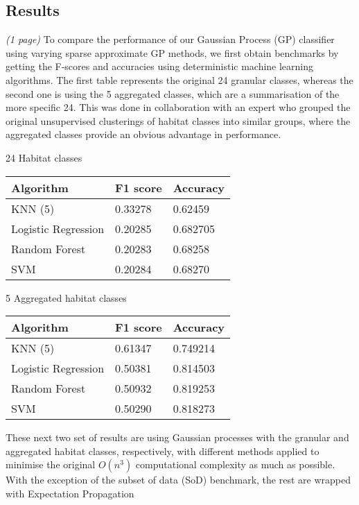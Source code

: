 \documentclass[10pt,sts]{article}
\begin{document}
\begin{multicols}{2}
    \newpage

\section{Results}
\textit{(1 page)}
To compare the performance of our Gaussian Process (GP) classifier using varying sparse approximate GP methods, we first obtain benchmarks by getting the F-scores and accuracies using deterministic machine learning algorithms. The first table represents the original 24 granular classes, whereas the second one is using the 5 aggregated classes, which are a summarisation of the more specific 24. This was done in collaboration with an expert who grouped the original unsupervised clusterings of habitat classes into similar groups, where the aggregated classes provide an obvious advantage in performance.
    
24 Habitat classes

\begin{tabular}{| l | l | l |}
    \hline
    Algorithm           & F1 score & Accuracy \\\hline
    KNN (5)             & 0.33278 & 0.62459 \\
    Logistic Regression & 0.20285 & 0.682705 \\
    Random Forest       & 0.20283 & 0.68258 \\
    SVM                 & 0.20284 & 0.68270 \\\hline
\end{tabular}

5 Aggregated habitat classes

\begin{tabular}{| l | l | l |}
    \hline
    Algorithm           & F1 score & Accuracy \\\hline
    KNN (5)             & 0.61347 & 0.749214 \\
    Logistic Regression & 0.50381 & 0.814503 \\
    Random Forest       & 0.50932 & 0.819253 \\
    SVM                 & 0.50290 & 0.818273 \\\hline
\end{tabular}

These next two set of results are using Gaussian processes with the granular and aggregated habitat classes, respectively, with different methods applied to minimise the original $O(n^3)$ computational complexity as much as possible. With the exception of the subset of data (SoD) benchmark, the rest are wrapped with Expectation Propagation


\end{multicols}
\end{document}
